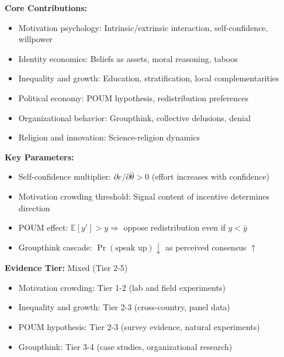\begin{tcolorbox}[colback=gray!5!white,colframe=gray!75!black,title=Quick Reference]
\textbf{Core Contributions:}
\begin{itemize}
    \item Motivation psychology: Intrinsic/extrinsic interaction, self-confidence, willpower
    \item Identity economics: Beliefs as assets, moral reasoning, taboos
    \item Inequality and growth: Education, stratification, local complementarities
    \item Political economy: POUM hypothesis, redistribution preferences
    \item Organizational behavior: Groupthink, collective delusions, denial
    \item Religion and innovation: Science-religion dynamics
\end{itemize}

\textbf{Key Parameters:}
\begin{itemize}
    \item Self-confidence multiplier: $\partial e / \partial \hat{\theta} > 0$ (effort increases with confidence)
    \item Motivation crowding threshold: Signal content of incentive determines direction
    \item POUM effect: $\mathbb{E}[y'] > y \Rightarrow$ oppose redistribution even if $y < \bar{y}$
    \item Groupthink cascade: $\Pr(\text{speak up}) \downarrow$ as perceived consensus $\uparrow$
\end{itemize}

\textbf{Evidence Tier:} Mixed (Tier 2-5)
\begin{itemize}
    \item Motivation crowding: Tier 1-2 (lab and field experiments)
    \item Inequality and growth: Tier 2-3 (cross-country, panel data)
    \item POUM hypothesis: Tier 2-3 (survey evidence, natural experiments)
    \item Groupthink: Tier 3-4 (case studies, organizational research)
\end{itemize}
\end{tcolorbox}


